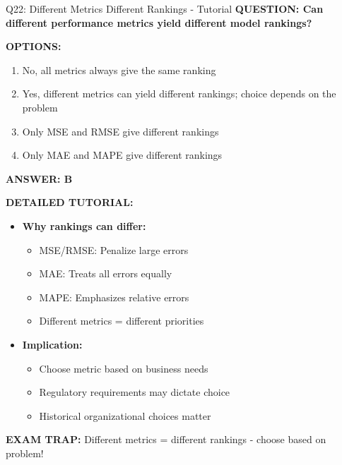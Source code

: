 \documentclass[8pt]{beamer}
\begin{document}
	\begin{frame}{Q22: Different Metrics Different Rankings - Tutorial}
		\fontsize{6.5}{7.5}\selectfont
		\textbf{QUESTION: Can different performance metrics yield different model rankings?}
		
		\vspace{0.1cm}
		\textbf{OPTIONS:}
		\begin{enumerate}
			\item No, all metrics always give the same ranking
			\item Yes, different metrics can yield different rankings; choice depends on the problem
			\item Only MSE and RMSE give different rankings
			\item Only MAE and MAPE give different rankings
		\end{enumerate}
		
		\vspace{0.1cm}
		\textcolor{myblue}{\textbf{ANSWER: B}}
		
		\vspace{0.1cm}
		\textbf{DETAILED TUTORIAL:}
		\begin{itemize}
			\item \textbf{Why rankings can differ:}
			\begin{itemize}
				\item MSE/RMSE: Penalize large errors
				\item MAE: Treats all errors equally
				\item MAPE: Emphasizes relative errors
				\item Different metrics = different priorities
			\end{itemize}
			\item \textbf{Implication:}
			\begin{itemize}
				\item Choose metric based on business needs
				\item Regulatory requirements may dictate choice
				\item Historical organizational choices matter
			\end{itemize}
		\end{itemize}
		
		\textcolor{myred}{\textbf{EXAM TRAP:}} Different metrics = \textcolor{myblue}{different rankings} - choose based on problem!
	\end{frame}
	
\end{document}
